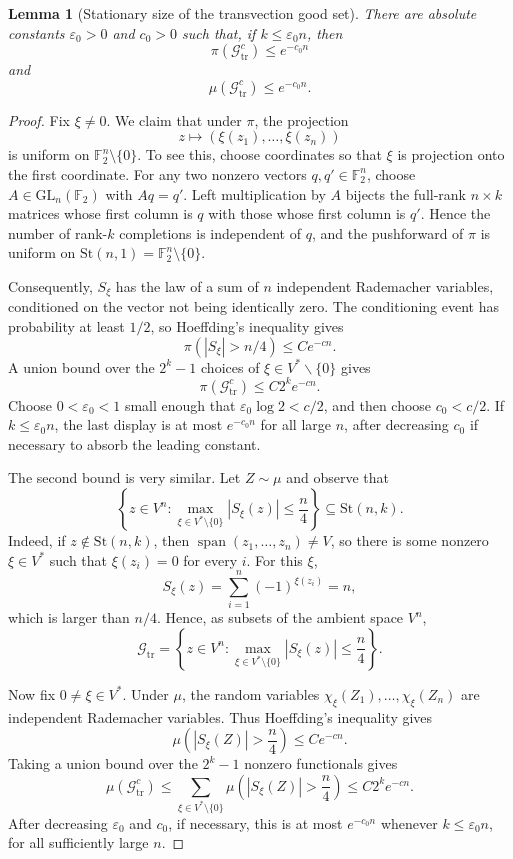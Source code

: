 \documentclass[11pt, reqno]{amsart}
\numberwithin{equation}{section}
\newtheorem{lemma}[theorem]{Lemma}
\newcommand{\Ft}{\mathbb F_2}
\newcommand{\Stief}[2]{\mathrm{St}(#1,#2)}
\newcommand{\Span}{\operatorname{span}}
\newcommand{\Good}{\mathcal G}
\begin{document}
\begin{lemma}[Stationary size of the transvection good set]\label{lem:tr-good-stationary}
There are absolute constants \(\varepsilon_0>0\) and \(c_0>0\) such that, if
\(k\le\varepsilon_0 n\), then
\[
    \pi(\Good_{\mathrm{tr}}^c)\le e^{-c_0 n} 
\]
and
\[
    \mu(\Good_{\mathrm{tr}}^{c}) \le e^{-c_{0} n}.
\]
\end{lemma}

\begin{proof}
Fix \(\xi\ne0\).  We claim that under \(\pi\), the projection
\[
    z\mapsto(\xi(z_1),\ldots,\xi(z_n))
\]
is uniform on \(\Ft^n\setminus\{0\}\).  To see this, choose coordinates so that
\(\xi\) is projection onto the first coordinate.  For any two nonzero vectors
\(q,q'\in\Ft^n\), choose \(A\in\mathrm{GL}_n(\Ft)\) with \(Aq=q'\).  Left
multiplication by \(A\) bijects the full-rank \(n\times k\) matrices whose first
column is \(q\) with those whose first column is \(q'\).  Hence the number of
rank-\(k\) completions is independent of \(q\), and the pushforward of \(\pi\)
is uniform on \(\Stief{n}{1}=\Ft^n\setminus\{0\}\).

Consequently, \(S_\xi\) has the law of a sum of \(n\) independent Rademacher
variables, conditioned on the vector not being identically zero.  The
conditioning event has probability at least \(1/2\), so Hoeffding's inequality
gives
\[
    \pi(|S_\xi|>n/4)\le Ce^{-cn}.
\]
A union bound over the \(2^k-1\) choices of $\xi \in V^{\ast} \backslash \{0\}$ gives
\[
    \pi(\Good_{\mathrm{tr}}^c)\le C2^k e^{-cn}.
\]
Choose \( 0 < \varepsilon_0 < 1\) small enough that
\(\varepsilon_0\log2<c/2\), and then choose \(c_0<c/2\).  If
\(k\le\varepsilon_0n\), the last display is at most \(e^{-c_0n}\) for all large
\(n\), after decreasing \(c_0\) if necessary to absorb the leading constant.

The second bound is very similar. Let \(Z\sim\mu\) and observe that
\[
    \left\{z\in V^n:
    \max_{\xi\in V^*\setminus\{0\}} |S_\xi(z)|\le \frac n4
    \right\}
    \subseteq \Stief{n}{k}.
\]
Indeed, if \(z\notin\Stief{n}{k}\), then
\(\Span(z_1,\ldots,z_n)\ne V\), so there is some nonzero
\(\xi\in V^*\) such that \(\xi(z_i)=0\) for every \(i\).  For this \(\xi\),
\[
    S_\xi(z)=\sum_{i=1}^n (-1)^{\xi(z_i)}=n,
\]
which is larger than \(n/4\).  Hence, as subsets of the ambient space \(V^n\),
\[
    \Good_{\mathrm{tr}}
    =
    \left\{z\in V^n:
    \max_{\xi\in V^*\setminus\{0\}} |S_\xi(z)|\le \frac n4
    \right\}.
\]

Now fix \(0\ne\xi\in V^*\).  Under \(\mu\), the random variables
\(\chi_\xi(Z_1),\ldots,\chi_\xi(Z_n)\) are independent Rademacher variables.
Thus Hoeffding's inequality gives
\[
    \mu\left(|S_\xi(Z)|>\frac n4\right)\le C e^{-cn}.
\]
Taking a union bound over the \(2^k-1\) nonzero functionals gives
\[
    \mu(\Good_{\mathrm{tr}}^c)
    \le
    \sum_{\xi\in V^*\setminus\{0\}}
    \mu\left(|S_\xi(Z)|>\frac n4\right)
    \le C2^k e^{-cn}.
\]
After decreasing \(\varepsilon_0\) and \(c_0\), if necessary, this is at most
\(e^{-c_0n}\) whenever \(k\le\varepsilon_0 n\), for all sufficiently large
\(n\).
\end{proof}
\end{document}
